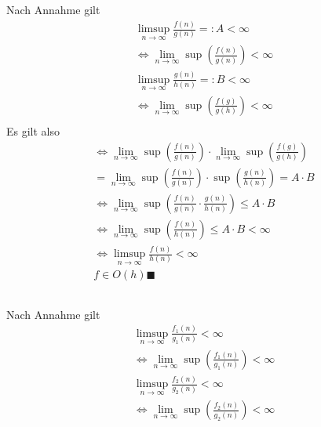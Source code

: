 \documentclass{article}
\begin{document}
    \section{}
    \subsection{}
    Nach Annahme gilt
    \begin{align*}
        \limsup\limits_{n\rightarrow\infty}\frac{f(n)}{g(n)} =: A< \infty\\
        \Leftrightarrow\lim\limits_{n\rightarrow\infty}\sup(\frac{f(n)}{g(n)}) < \infty\\
        \limsup\limits_{n\rightarrow\infty}\frac{g(n)}{h(n)} =: B< \infty\\
        \Leftrightarrow\lim\limits_{n\rightarrow\infty}\sup(\frac{f(g)}{g(h)}) < \infty\\
    \end{align*}
    Es gilt also
    \begin{align*}
        \Leftrightarrow\lim\limits_{n\rightarrow\infty}\sup(\frac{f(n)}{g(n)}) \cdot
        \lim\limits_{n\rightarrow\infty}\sup(\frac{f(g)}{g(h)})\\
        = \lim\limits_{n\rightarrow\infty}\sup(\frac{f(n)}{g(n)})\cdot\sup(\frac{g(n)}{h(n)}) = A \cdot B\\
        \Leftrightarrow \lim\limits_{n\rightarrow\infty}\sup(\frac{f(n)}{g(n)}\cdot\frac{g(n)}{h(n)}) \leq A \cdot B\\
        \Leftrightarrow \lim\limits_{n\rightarrow\infty}\sup(\frac{f(n)}{h(n)}) \leq A \cdot B < \infty\\
        \Leftrightarrow \limsup\limits_{n\rightarrow\infty}\frac{f(n)}{h(n)} < \infty\\
        f\in O(h) \blacksquare
    \end{align*}
    \subsection{}
    Nach Annahme gilt
    \begin{align*}
        \limsup\limits_{n\rightarrow\infty}\frac{f_1(n)}{g_1(n)} < \infty\\
        \Leftrightarrow\lim\limits_{n\rightarrow\infty}\sup(\frac{f_1(n)}{g_1(n)}) < \infty\\
        \limsup\limits_{n\rightarrow\infty}\frac{f_2(n)}{g_2(n)} < \infty\\
        \Leftrightarrow\lim\limits_{n\rightarrow\infty}\sup(\frac{f_2(n)}{g_2(n)}) < \infty\\
    \end{align*}
\end{document}
